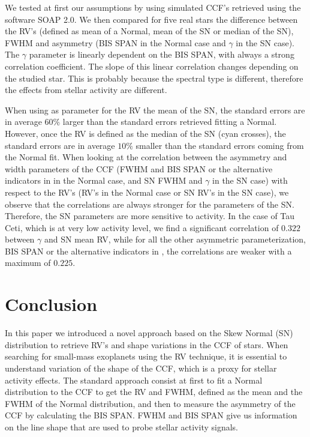 \documentclass[11pt, oneside]{article}
\def\kms{\hbox{\,km\,s$^{-1}$}}       %
\begin{document}
We tested at first our assumptions by using simulated CCF's retrieved using the software SOAP 2.0. We then compared for five real stars the difference between the RV's (defined as mean of a Normal, mean of the SN or median of the SN), FWHM and asymmetry (BIS SPAN in the Normal case and $\gamma$ in the SN case). The $\gamma$ parameter is linearly dependent on the BIS SPAN, with always a strong correlation coefficient. 
The slope of this linear correlation changes depending on the studied star. This is probably because the spectral type is different, therefore the effects from stellar activity are different.

When using as parameter for the RV the mean of the SN, the standard errors are in average $60\%$ larger than the standard errors retrieved fitting a Normal. However, once the RV is defined as the median of the SN (cyan crosses), the standard errors are in average $10\%$ smaller than the standard errors coming from the Normal fit. When looking at the correlation between the asymmetry and width parameters of the CCF (FWHM and BIS SPAN or the alternative indicators in \citet{Figueira-2013} in the Normal case, and SN FWHM and $\gamma$ in the SN case) with respect to the RV's (RV's in the Normal case or SN RV's in the SN case), we observe that the correlations are always stronger for the parameters of the SN. Therefore, the SN parameters are more sensitive to activity. In the case of Tau Ceti, which is at very low activity level, we find a significant correlation of $0.322$ between $\gamma$ and SN mean RV, while for all the other asymmetric parameterization, BIS SPAN or the alternative indicators in \citet{Figueira-2013}, the correlations are weaker with a maximum of 0.$225$.

\section{Conclusion} \label{sec:conclu}

In this paper we introduced a novel approach based on the Skew Normal (SN) distribution to retrieve RV's and shape variations in the CCF of stars. When searching for small-mass exoplanets using the RV technique, it is essential to understand variation of the shape of the CCF, which is a proxy for stellar activity effects. The standard approach consist at first to fit a Normal distribution to the CCF to get the RV and FWHM, defined as the mean and the FWHM of the Normal distribution, and then to measure the asymmetry of the CCF by calculating the BIS SPAN. FWHM and BIS SPAN give us information on the line shape that are used to probe stellar activity signals. 
\end{document}
